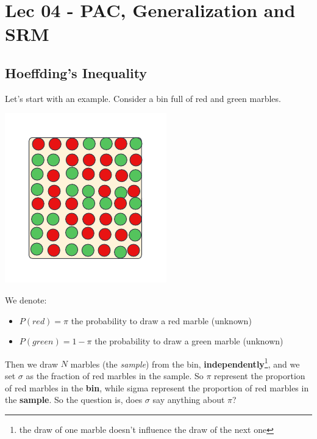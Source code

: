 \chapter{Lec 04 - PAC, Generalization and SRM}
\section{Hoeffding's Inequality}
Let's start with an example. Consider a bin full of red and green marbles.
\begin{center}
    \includegraphics{images/Marbles Bin.png}
\end{center}
We denote:
\begin{itemize}
    \item $P(red) = \pi$ the probability to draw a red marble (unknown)
    \item $P(green) = 1 - \pi$ the probability to draw a green marble (unknown)
\end{itemize}
Then we draw $N$ marbles (the \textit{sample}) from the bin, \textbf{independently}\footnote{the draw of one marble doesn't influence the draw of the next one}, and we set $\sigma$ as the fraction of red marbles in the sample. So $\pi$ represent the proportion of red marbles in the \textbf{bin}, while sigma represent the proportion of red marbles in the \textbf{sample}. So the question is, does $\sigma$ say anything about $\pi$?

